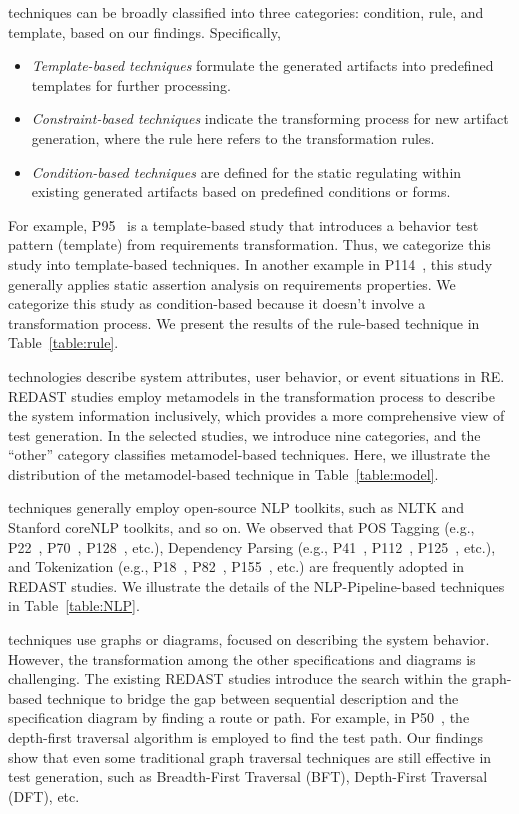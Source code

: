 
techniques can be broadly classified into three categories: condition, rule, and template, based on our findings. Specifically, 
\begin{itemize}
    \item \textit{Template-based techniques} formulate the generated artifacts into predefined templates for further processing.
    \item \textit{Constraint-based techniques} indicate the transforming process for new artifact generation, where the rule here refers to the transformation rules.
    \item \textit{Condition-based techniques} are defined for the static regulating within existing generated artifacts based on predefined conditions or forms.
\end{itemize}
For example, P95~ is a template-based study that introduces a behavior test pattern (template) from requirements transformation. Thus, we categorize this study into template-based techniques. In another example in P114~, this study generally applies static assertion analysis on requirements properties. We categorize this study as condition-based because it doesn't involve a transformation process. We present the results of the rule-based technique in Table~\ref{table:rule}.


technologies describe system attributes, user behavior, or event situations in RE. REDAST studies employ metamodels in the transformation process to describe the system information inclusively, which provides a more comprehensive view of test generation. In the selected studies, we introduce nine categories, and the ``other'' category classifies metamodel-based techniques. Here, we illustrate the distribution of the metamodel-based technique in Table~\ref{table:model}.


 techniques generally employ open-source NLP toolkits, such as NLTK and Stanford coreNLP toolkits, and so on. We observed that POS Tagging (e.g., P22~, P70~, P128~, etc.), Dependency Parsing (e.g., P41~, P112~, P125~, etc.), and Tokenization (e.g., P18~, P82~, P155~, etc.) are frequently adopted in REDAST studies. We illustrate the details of the NLP-Pipeline-based techniques in Table~\ref{table:NLP}.


 techniques use graphs or diagrams, focused on describing the system behavior. However, the transformation among the other specifications and diagrams is challenging. The existing REDAST studies introduce the search within the graph-based technique to bridge the gap between sequential description and the specification diagram by finding a route or path. For example, in P50~, the depth-first traversal algorithm is employed to find the test path. Our findings show that even some traditional graph traversal techniques are still effective in test generation, such as Breadth-First Traversal (BFT), Depth-First Traversal (DFT), etc.

